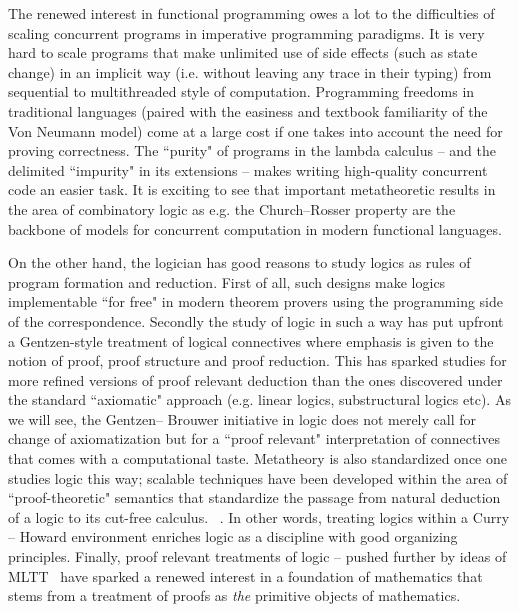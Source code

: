 The renewed interest in functional programming owes a lot to the
 difficulties of scaling concurrent programs in imperative programming paradigms. 
 It is very hard  to scale programs that make unlimited use of side effects 
 (such as state change) in an implicit way (i.e. without leaving any trace in their typing)
  from sequential to  multithreaded style of computation. Programming freedoms in traditional 
  languages (paired with the easiness and textbook familiarity of the Von Neumann model) come 
  at a large cost if one takes into account the need for proving 
  correctness. The ``purity" of
   programs in the lambda calculus -- and the delimited ``impurity" in its extensions -- makes 
   writing high-quality concurrent code an easier task. 
   It is exciting to see that important metatheoretic results in the area of combinatory logic as e.g. the Church--Rosser 
   property are the backbone of models for concurrent computation in modern functional languages. 



On the other hand, the logician has good reasons to study logics as rules of program formation and reduction. First of all, 
such designs make logics implementable ``for free"
in modern theorem provers using the programming side of the correspondence. 
Secondly the study of logic in such a way has put upfront a  Gentzen-style treatment of logical 
connectives where emphasis is given to the notion of proof, proof structure and proof reduction. 
This has sparked studies for more refined versions of proof relevant deduction than the ones 
discovered under the standard ``axiomatic" approach (e.g. linear logics, substructural logics etc). 
As we will see, the Gentzen-- Brouwer initiative in  logic  does not merely call for change of 
axiomatization but for a ``proof relevant" interpretation of connectives that comes with a
computational taste. Metatheory is also standardized once one studies logic this way;  
scalable techniques have been developed within the area of ``proof-theoretic" semantics 
that standardize the passage from  natural deduction of a logic to its cut-free calculus.
 ~\cite{Sieg1998,pfenning2000structural}. 
In other words, treating logics within a Curry -- Howard environment 
enriches logic as a discipline with good organizing principles. 
Finally, proof relevant treatments of logic -- pushed further by ideas of 
\ac{MLTT}~\cite{martin1984intuitionistic} 
have sparked  a renewed interest in  a foundation of mathematics that stems from 
a  treatment of proofs as \textit{the} primitive objects of mathematics. 


